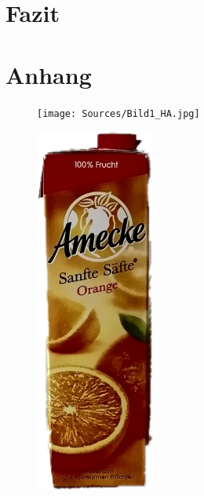 \documentclass[a4paper,12pt,oneside]{article}
\begin{document}
  \section{Fazit}
  \newpage
  \printbibliography
  \newpage
  \section*{Anhang}
\begin{figure}[htb]
\begin{minipage}[c]{0.2\textwidth}
\texttt{[image: Sources/Bild1\_HA.jpg]}
\end{minipage}
\hfill
\begin{minipage}[c]{0.08\textwidth}
\includegraphics[width=\textwidth]{Sources/Bild1_HA.png}

\end{minipage}
\end{figure}
\end{document}
